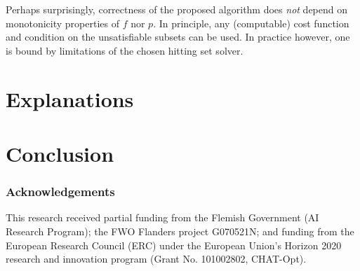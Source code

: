 \documentclass{llncs}
\begin{document}
Perhaps surprisingly, correctness of the proposed algorithm does \emph{not} depend on monotonicity properties of $f$ nor $p$. In principle, any (computable) cost function and condition on the unsatisfiable subsets can be used. In practice however, one is bound by limitations of the chosen hitting set solver.


\section{Explanations}

\section{Conclusion}

\subsubsection{Acknowledgements} This research received partial funding from the Flemish Government (AI Research Program); the FWO Flanders project G070521N; and funding from the European Research Council (ERC) under the European Union’s Horizon 2020 research and innovation program (Grant No. 101002802, CHAT-Opt).

%
%
%
 
 
\end{document}
